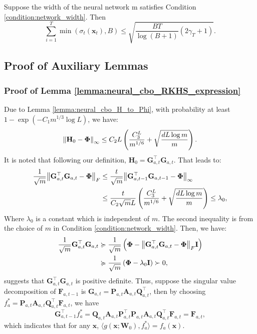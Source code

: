 \begin{auxlemma}
\label{lemma:neural_cbo_min_sigma}
Suppose the width of the neural network m satisfies Condition \ref{condition:network_width}. Then 
\begin{equation*}
    \sum_{i=1}^T \min(\sigma_t(\mathbf{x}_t),B) \leq \sqrt{\frac{ BT}{\log(B+1)} (2\gamma_T+1)}.
\end{equation*}
\end{auxlemma}

\subsection{Proof of Auxiliary Lemmas}
\subsubsection{Proof of Lemma \ref{lemma:neural_cbo_RKHS_expression}}

    Due to Lemma \ref{lemma:neural_cbo_H_to_Phi}, with probability at least $1 - \exp (-C_1 m^{1/3} \log L)$, we have:
    \[
    \norm{\mathbf{H}_0 - \boldsymbol{\Phi}}_\infty \le C_2 L \left(\frac{C_3^L}{m^{1/6}} + \sqrt{\frac{dL\log m}{m}}\right).
    \] 
    It is noted that following our definition,  $\mathbf{H}_0 = \mathbf{G}_{a,t} ^\top \mathbf{G}_{a,t}$. That leads to:
    \begin{align*}
        \frac{1}{\sqrt{m}}\norm{\mathbf{G}_{a,t} ^\top \mathbf{G}_{a,t} - \boldsymbol{\Phi}}_F & \le \frac{t}{\sqrt{m}} \norm{\mathbf{G}_{a,t-1} ^\top \mathbf{G}_{a,t-1} - \boldsymbol{\Phi}}_\infty 
        \\
        & \le \frac{t}{C_2 \sqrt{m} L} \left(\frac{C_3^L}{m^{1/6}} + \sqrt{\frac{dL\log m}{m}}\right)  \le \lambda_0,
    \end{align*}
    Where $\lambda_0$ is a constant which is independent of $m$. The second inequality is from the choice of $m$ in Condition \ref{condition:network_width}. 
    Then, we have:
    \begin{align*}
        \frac{1}{\sqrt{m}}\mathbf{G}_{a,t} ^\top \mathbf{G}_{a,t} & \succcurlyeq  \frac{1}{\sqrt{m}} \left(\boldsymbol{\Phi} - 
        \norm{\mathbf{G}_{a,t} ^\top \mathbf{G}_{a,t} - \boldsymbol{\Phi}}_F \mathbf{I} \right)
        \\
        & \succcurlyeq \frac{1}{\sqrt{m}} \left(\boldsymbol{\Phi} - 
        \lambda_0 \mathbf{I} \right) \succ 0, 
    \end{align*}
    suggests that $\mathbf{G}_{a,t} ^\top \mathbf{G}_{a,t}$ is positive definite.  Thus, suppose the singular value decomposition of $\mathbf{F}_{a,t-1}$ is $\mathbf{G}_{a,t} = \mathbf{P}_{a,t} \mathbf{A}_{a,t} \mathbf{Q}_{a,t}^\top$, then by choosing $f_a^* = \mathbf{P}_{a,t} \mathbf{A}_{a,t} \mathbf{Q}_{a,t}^\top \mathbf{F}_{a,t}$, we have
    \[
    \mathbf{G}_{a,t-1}^\top f_a^* =  \mathbf{Q}_{a,t} \mathbf{A}_{a,t} \mathbf{P}_{a,t}^\top \mathbf{P}_{a,t} \mathbf{A}_{a,t} \mathbf{Q}_{a,t}^\top \mathbf{F}_{a,t}  = \mathbf{F}_{a,t}, 
    \]
    which indicates that for any $\mathbf{x}$, $\langle g(\mathbf{x}; \mathbf{W}_0), f_a^*\rangle = f_a(\mathbf{x})$.

